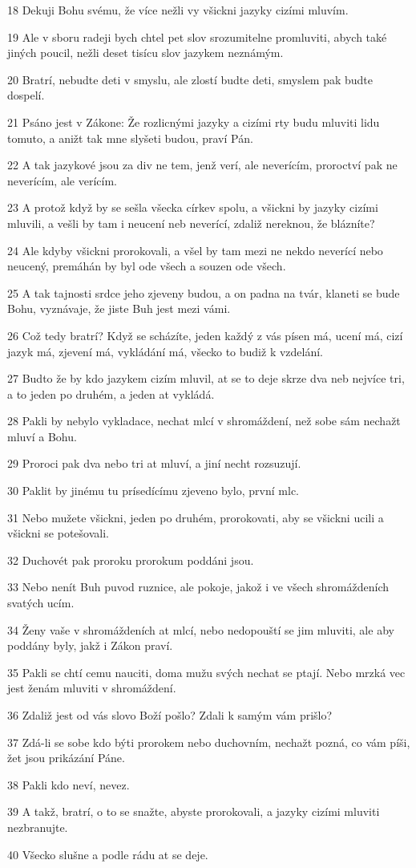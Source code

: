 \par 18 Dekuji Bohu svému, že více nežli vy všickni jazyky cizími mluvím.
\par 19 Ale v sboru radeji bych chtel pet slov srozumitelne promluviti, abych také jiných poucil, nežli deset tisícu slov jazykem neznámým.
\par 20 Bratrí, nebudte deti v smyslu, ale zlostí budte deti, smyslem pak budte dospelí.
\par 21 Psáno jest v Zákone: Že rozlicnými jazyky a cizími rty budu mluviti lidu tomuto, a anižt tak mne slyšeti budou, praví Pán.
\par 22 A tak jazykové jsou za div ne tem, jenž verí, ale neverícím, proroctví pak ne neverícím, ale verícím.
\par 23 A protož když by se sešla všecka církev spolu, a všickni by jazyky cizími mluvili, a vešli by tam i neucení neb neverící, zdaliž nereknou, že blázníte?
\par 24 Ale kdyby všickni prorokovali, a všel by tam mezi ne nekdo neverící nebo neucený, premáhán by byl ode všech a souzen ode všech.
\par 25 A tak tajnosti srdce jeho zjeveny budou, a on padna na tvár, klaneti se bude Bohu, vyznávaje, že jiste Buh jest mezi vámi.
\par 26 Což tedy bratrí? Když se scházíte, jeden každý z vás písen má, ucení má, cizí jazyk má, zjevení má, vykládání má, všecko to budiž k vzdelání.
\par 27 Budto že by kdo jazykem cizím mluvil, at se to deje skrze dva neb nejvíce tri, a to jeden po druhém, a jeden at vykládá.
\par 28 Pakli by nebylo vykladace, nechat mlcí v shromáždení, než sobe sám nechažt mluví a Bohu.
\par 29 Proroci pak dva nebo tri at mluví, a jiní necht rozsuzují.
\par 30 Paklit by jinému tu prísedícímu zjeveno bylo, první mlc.
\par 31 Nebo mužete všickni, jeden po druhém, prorokovati, aby se všickni ucili a všickni se potešovali.
\par 32 Duchovét pak proroku prorokum poddáni jsou.
\par 33 Nebo nenít Buh puvod ruznice, ale pokoje, jakož i ve všech shromáždeních svatých ucím.
\par 34 Ženy vaše v shromáždeních at mlcí, nebo nedopouští se jim mluviti, ale aby poddány byly, jakž i Zákon praví.
\par 35 Pakli se chtí cemu nauciti, doma mužu svých nechat se ptají. Nebo mrzká vec jest ženám mluviti v shromáždení.
\par 36 Zdaliž jest od vás slovo Boží pošlo? Zdali k samým vám prišlo?
\par 37 Zdá-li se sobe kdo býti prorokem nebo duchovním, nechažt pozná, co vám píši, žet jsou prikázání Páne.
\par 38 Pakli kdo neví, nevez.
\par 39 A takž, bratrí, o to se snažte, abyste prorokovali, a jazyky cizími mluviti nezbranujte.
\par 40 Všecko slušne a podle rádu at se deje.

